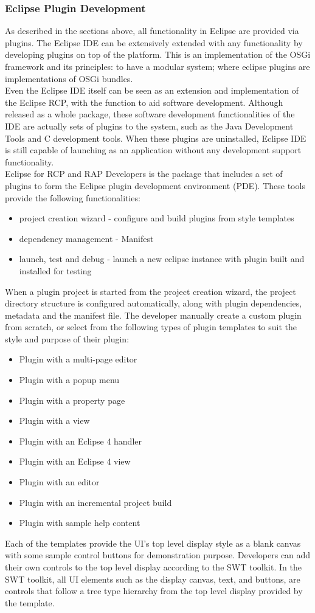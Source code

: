 \subsubsection{Eclipse Plugin Development}
As described in the sections above, all functionality in Eclipse are provided via plugins. The Eclipse IDE can be extensively extended with any functionality by developing plugins on top of the platform. This is an implementation of the OSGi framework and its principles: to have a modular system; where eclipse plugins are implementations of OSGi bundles.\\
Even the Eclipse IDE itself can be seen as an extension and implementation of the Eclipse RCP, with the function to aid software development. Although released as a whole package, these software development functionalities of the IDE are actually sets of plugins to the system, such as the Java Development Tools and C development tools. When these plugins are uninstalled, Eclipse IDE is still capable of launching as an application without any development support functionality.\\
Eclipse for RCP and RAP Developers is the package that includes a set of plugins to form the Eclipse plugin development environment (PDE). These tools provide the following functionalities: \cite{vogella}
\begin{itemize}
\item project creation wizard - configure and build plugins from style templates
\item dependency management - Manifest
\item launch, test and debug - launch a new eclipse instance with plugin built and installed for testing
\end{itemize}
When a plugin project is started from the project creation wizard, the project directory structure is configured automatically, along with plugin dependencies, metadata and the manifest file. The developer manually create a custom plugin from scratch, or select from the following types of plugin templates to suit the style and purpose of their plugin:
\begin{itemize}
\item Plugin with a multi-page editor
\item Plugin with a popup menu
\item Plugin with a property page
\item Plugin with a view
\item Plugin with an Eclipse 4 handler
\item Plugin with an Eclipse 4 view
\item Plugin with an editor
\item Plugin with an incremental project build
\item Plugin with sample help content
\end{itemize}
Each of the templates provide the UI's top level display style as a blank canvas with some sample control buttons for demonstration purpose. Developers can add their own controls to the top level display according to the SWT toolkit. In the SWT toolkit, all UI elements such as the display canvas, text, and buttons, are controls that follow a tree type hierarchy from the top level display provided by the template.

